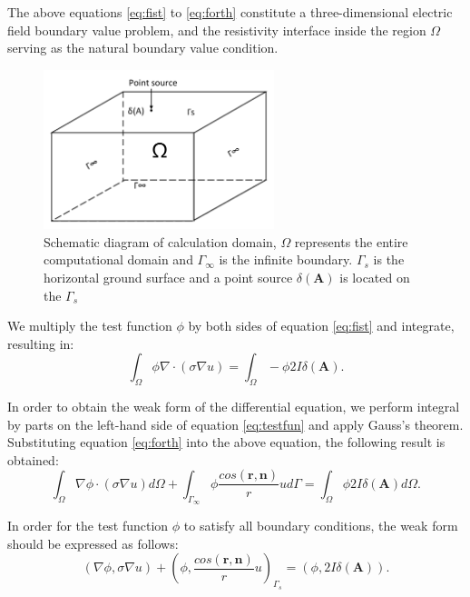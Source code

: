 \documentclass[extra, referee]{gji}
\begin{document}
The above equations \ref{eq:fist} to \ref{eq:forth} constitute a
three-dimensional electric field boundary value problem, and the resistivity
interface inside the region $\Omega$ serving as the natural boundary value
condition.
\begin{figure}
  \centering
  \includegraphics[width=0.6\textwidth ]{fig/compute_domain.pdf}
  \caption{Schematic diagram of calculation domain, $ \Omega$ represents the entire computational domain and $\Gamma_\infty$ is the infinite boundary. $\Gamma_s$ is the horizontal ground surface and a point source $\delta(\mathbf{A})$ is located on the $\Gamma_s$ }
  \label{fig:compute_domain}
\end{figure}

We multiply the test function $\phi$ by both sides of equation \ref{eq:fist} and
integrate, resulting in:
\begin{equation}
   \label{eq:testfun}
   \int_{\Omega} \phi\nabla \cdot(\sigma\nabla u )= \int_{\Omega} -\phi 2 I \delta( \mathbf{A}).
\end{equation}

In order to obtain the weak form of the differential equation, we perform
integral by parts on the left-hand side of equation \ref{eq:testfun} and apply
Gauss's theorem. Substituting equation \ref{eq:forth} into the above equation,
the following result is obtained:
\begin{equation}
  \label{eq:testfun1}
  \int_{\Omega} \nabla \phi \cdot (\sigma \nabla u) {d}\Omega + \int_{ \Gamma_\infty}\phi\frac{ {cos}(\mathbf{r}, \mathbf{n})}{r} {u} {d}\Gamma= \int_{\Omega}\phi 2 {I} \delta( \mathbf{A}) {d}\Omega.
\end{equation}

In order for the test function $\phi$ to satisfy all boundary conditions, the
weak form should be expressed as follows:
\begin{equation}
  \label{eq:testfun2}
  (\nabla \phi, \sigma\nabla u )+ (\phi, \frac{ {cos}(\mathbf{r}, \mathbf{n})}{r} u)_{\Gamma_s}= (\phi, 2 I \delta( \mathbf{A})).
\end{equation}
\end{document}
